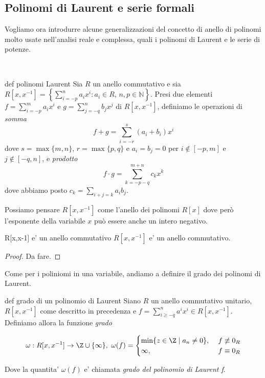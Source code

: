 
\subsection{Polinomi di Laurent e serie formali}

\noindent Vogliamo ora introdurre alcune generalizzazioni del concetto di anello di polinomi molto usate nell'analisi reale e complessa, quali i polinomi di Laurent e le serie di potenze. 

\

\begin{defn}{def polinomi Laurent}
  Sia $R$ un anello commutativo e sia $R[x,x^{-1}]=\left\{\sum\limits_{i=-p}^n a_ix^i : a_i\in R,\, n,p\in \mathbb{N}\right\}$. 
  Presi due elementi $f=\sum\limits_{i=-p}^m a_ix^i$ e $g=\sum\limits_{j=-q}^n b_jx^j$ di $R[x,x^{-1}]$, definiamo le operazioni di \emph{somma} 
  \[ f+g=\sum\limits_{i=-r}^s (a_i+b_i)x^i \] 
  \noindent dove $s=\max\{m,n\}$, $r=\max\{p,q\}$ e $a_i=b_j=0$ per $i\not\in [-p,m]$ e $j\not\in [-q,n]$, e \emph{prodotto} 
  \[ f\cdot g=\sum\limits_{k=-p-q}^{m+n}c_k x^k\] 
  \noindent dove abbiamo posto $c_k=\sum\limits_{i+j=k} a_i b_j$. 
\end{defn}

\begin{obs}
  Possiamo pensare $R[x,x^{-1}]$ come l'anello dei polinomi $R[x]$ dove però l'esponente della variabile $x$ può essere anche un intero negativo.
\end{obs}

\begin{lem}[]{R[x,x-1] e' un anello commutativo}
  $R[x, x^{-1}]$ e' un anello commutativo.
\end{lem}
\begin{proof}
  Da fare.
\end{proof}

\noindent Come per i poliniomi in una variabile, andiamo a definire il grado dei polinomi di Laurent.

\begin{defn}{def grado di un polinomio di Laurent}
  Siano $R$ un anello commutativo unitario, $R[x, x^{-1}]$ come descritto in precedenza e $f = \sum_{i\geq -q}^{n}a^i x^i \in R[x, x^{-1}]$. 
  Definiamo allora la funzione \emph{grado}

    \[ \omega : R[x,x^{-1}] \rightarrow \Z \cup \{\infty\},\ \omega(f) = 
      \begin{cases}
        \min\{ z \in \Z \mid a_n \neq 0 \},\ &f \not\equiv 0_R\\
        \infty, &f \equiv 0_R
      \end{cases}
    \]
  
  Dove la quantita' $\omega(f)$ e' chiamata \emph{grado del polinomio di Laurent f}.
\end{defn}

